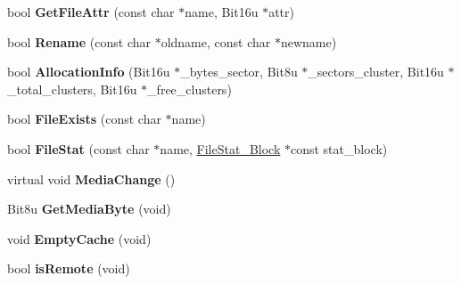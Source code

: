 \begin{DoxyCompactItemize}
\item 
\hypertarget{classVirtual__Drive_ac5a26ae326fe4ef86c3aeeab030640db}{bool {\bfseries Get\-File\-Attr} (const char $\ast$name, Bit16u $\ast$attr)}\label{classVirtual__Drive_ac5a26ae326fe4ef86c3aeeab030640db}

\item 
\hypertarget{classVirtual__Drive_a5bafd492b22e85790ab37c94a1dd3d6b}{bool {\bfseries Rename} (const char $\ast$oldname, const char $\ast$newname)}\label{classVirtual__Drive_a5bafd492b22e85790ab37c94a1dd3d6b}

\item 
\hypertarget{classVirtual__Drive_afc40a6c58322450b7926af869f8552b5}{bool {\bfseries Allocation\-Info} (Bit16u $\ast$\-\_\-bytes\-\_\-sector, Bit8u $\ast$\-\_\-sectors\-\_\-cluster, Bit16u $\ast$\-\_\-total\-\_\-clusters, Bit16u $\ast$\-\_\-free\-\_\-clusters)}\label{classVirtual__Drive_afc40a6c58322450b7926af869f8552b5}

\item 
\hypertarget{classVirtual__Drive_a042c9df503a6929b8be4eb5c4ccb9d34}{bool {\bfseries File\-Exists} (const char $\ast$name)}\label{classVirtual__Drive_a042c9df503a6929b8be4eb5c4ccb9d34}

\item 
\hypertarget{classVirtual__Drive_ac1b5aa7a3e96c789a357eacacdbafee9}{bool {\bfseries File\-Stat} (const char $\ast$name, \hyperlink{structFileStat__Block}{File\-Stat\-\_\-\-Block} $\ast$const stat\-\_\-block)}\label{classVirtual__Drive_ac1b5aa7a3e96c789a357eacacdbafee9}

\item 
\hypertarget{classVirtual__Drive_a60c747bf84748c41f6489a85e354ce53}{virtual void {\bfseries Media\-Change} ()}\label{classVirtual__Drive_a60c747bf84748c41f6489a85e354ce53}

\item 
\hypertarget{classVirtual__Drive_a204a007b01b36835353da1cfe602f347}{Bit8u {\bfseries Get\-Media\-Byte} (void)}\label{classVirtual__Drive_a204a007b01b36835353da1cfe602f347}

\item 
\hypertarget{classVirtual__Drive_a07c23b86ce90e36cf6bfe57e700ef24f}{void {\bfseries Empty\-Cache} (void)}\label{classVirtual__Drive_a07c23b86ce90e36cf6bfe57e700ef24f}

\item 
\hypertarget{classVirtual__Drive_adaf2f6f0157674dc2dc1a27f190d6413}{bool {\bfseries is\-Remote} (void)}\label{classVirtual__Drive_adaf2f6f0157674dc2dc1a27f190d6413}


\end{DoxyCompactItemize}
